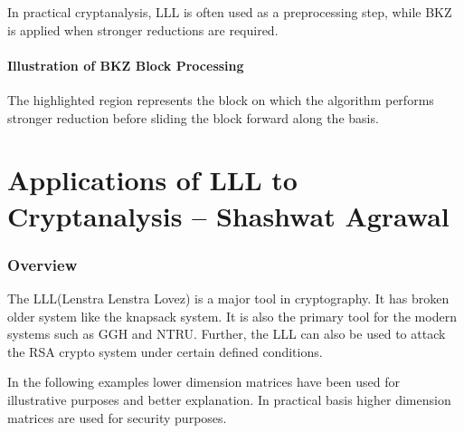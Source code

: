 \documentclass[12pt, a4paper]{article}
\theoremstyle{definition}
\theoremstyle{plain}
\begin{document}
In practical cryptanalysis, LLL is often used as a preprocessing step, while BKZ is applied when stronger reductions are required.

\subsection*{Illustration of BKZ Block Processing}

\begin{center}
\end{center}

The highlighted region represents the block on which the algorithm performs stronger reduction before sliding the block forward along the basis.

\newpage


\part{Applications of LLL to Cryptanalysis -- Shashwat Agrawal}

\section{Overview}

The LLL(Lenstra Lenstra Lovez) is a major tool in cryptography. It has broken older system like the knapsack system. It is also the primary tool for the modern systems such as GGH and NTRU. Further, the LLL can also be used to attack the RSA crypto system under certain defined conditions.

In the following examples lower dimension matrices have been used for illustrative purposes and better explanation. In practical basis higher dimension matrices are used for security purposes.
\end{document}
